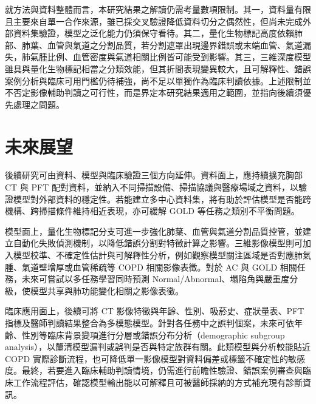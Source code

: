 \begin{ZhChapter}
就方法與資料整體而言，本研究結果之解讀仍需考量數項限制。其一，資料量有限且主要來自單一合作來源，雖已採交叉驗證降低資料切分之偶然性，但尚未完成外部資料集驗證，模型之泛化能力仍須保守看待。其二，量化生物標記高度依賴肺部、肺葉、血管與氣道之分割品質，若分割遮罩出現邊界錯誤或末端血管、氣道漏失，肺氣腫比例、血管密度與氣道相關比例皆可能受到影響。其三，三維深度模型雖具與量化生物標記相當之分類效能，但其折間表現變異較大，且可解釋性、錯誤案例分析與臨床可用門檻仍待補強，尚不足以單獨作為臨床判讀依據。上述限制並不否定影像輔助判讀之可行性，而是界定本研究結果適用之範圍，並指向後續須優先處理之問題。

\section{未來展望}

後續研究可由資料、模型與臨床驗證三個方向延伸。資料面上，應持續擴充胸部 CT 與 PFT 配對資料，並納入不同掃描設備、掃描協議與醫療場域之資料，以驗證模型對外部資料的穩定性。若能建立多中心資料集，將有助於評估模型是否能跨機構、跨掃描條件維持相近表現，亦可緩解 GOLD 等任務之類別不平衡問題。

模型面上，量化生物標記分支可進一步強化肺葉、血管與氣道分割品質控管，並建立自動化失敗偵測機制，以降低錯誤分割對特徵計算之影響。三維影像模型則可加入模型校準、不確定性估計與可解釋性分析，例如觀察模型關注區域是否對應肺氣腫、氣道壁增厚或血管稀疏等 COPD 相關影像表徵。對於 AC 與 GOLD 相關任務，未來可嘗試以多任務學習同時預測 Normal/Abnormal、塌陷角與嚴重度分級，使模型共享與肺功能變化相關之影像表徵。

臨床應用面上，後續可將 CT 影像特徵與年齡、性別、吸菸史、症狀量表、PFT 指標及醫師判讀結果整合為多模態模型。針對各任務中之誤判個案，未來可依年齡、性別等臨床背景變項進行分層或錯誤分布分析（demographic subgroup analysis），以釐清模型漏判或誤判是否與特定族群有關。此類模型與分析較能貼近 COPD 實際診斷流程，也可降低單一影像模型對資料偏差或標籤不確定性的敏感度。最終，若要進入臨床輔助判讀情境，仍需進行前瞻性驗證、錯誤案例審查與臨床工作流程評估，確認模型輸出能以可解釋且可被醫師採納的方式補充現有診斷資訊。

\end{ZhChapter}
